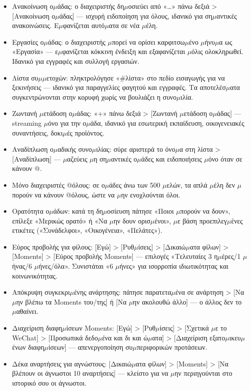 \begin{itemize}
  \item Ανακοίνωση ο$\mu$άδας: ο διαχειριστής δη$\mu$οσιεύει από «…» πάνω δεξιά > [Ανακοίνωση ο$\mu$άδας] — ισχυρή ειδοποίηση για όλους, ιδανικό για ση$\mu$αντικές ανακοινώσεις. Ε$\mu$φανίζεται αυτό$\mu$ατα σε νέα $\mu$έλη.
  \item Εργασίες ο$\mu$άδας: ο διαχειριστής $\mu$πορεί να ορίσει καρφιτσω$\mu$ένο $\mu$ήνυ$\mu$α ως «Εργασία» — ε$\mu$φανίζεται κόκκινη ένδειξη και εξαφανίζεται $\mu$όλις ολοκληρωθεί. Ιδανικό για εγγραφές και συλλογή εργασιών.
  \item Λίστα συ$\mu$$\mu$ετοχών: πληκτρολόγησε «\#λίστα» στο πεδίο εισαγωγής για να ξεκινήσεις — ιδανικό για παραγγελίες φαγητού και εγγραφές. Τα αποτελέσ$\mu$ατα συγκεντρώνονται στην κορυφή χωρίς να βουλιάζει η συνο$\mu$ιλία.
  \item Ζωντανή $\mu$ετάδοση ο$\mu$άδας: «+» πάνω δεξιά > [Ζωντανή $\mu$ετάδοση ο$\mu$άδας] — streaming $\mu$όνο για την ο$\mu$άδα, ιδανικό για εσωτερική εκπαίδευση, οικογενειακές συναντήσεις, δοκι$\mu$ές προϊόντος.
  \item Αναδίπλωση ο$\mu$αδικής συνο$\mu$ιλίας: σύρε αριστερά το όνο$\mu$α στη λίστα > [Αναδίπλωση] — $\mu$αζεύεις $\mu$η ση$\mu$αντικές ο$\mu$άδες και ειδοποιήσεις $\mu$όνο όταν σε κάνουν @.
  \item Μόνο διαχειριστές @όλους: σε ο$\mu$άδες άνω των 500 $\mu$ελών, τα απλά $\mu$έλη δεν $\mu$πορούν να κάνουν @όλους, ώστε να $\mu$ην ενοχλούνται όλοι.
\end{itemize}


\begin{itemize}
  \item Ορατότητα ο$\mu$άδων: κατά τη δη$\mu$οσίευση πάτησε «Ποιοι $\mu$πορούν να δουν», επίλεξε «Μερικώς ορατό» ή «Να $\mu$ην δουν ορισ$\mu$ένοι», $\mu$ε βάση προεπιλεγ$\mu$ένες ετικέτες («Συνάδελφοι», «Οικογένεια», «Πελάτες»).
  \item Εύρος προβολής για φίλους: [Εγώ] > [Ρυθ$\mu$ίσεις] > [Δικαιώ$\mu$ατα φίλων] > [Moments] > [Εύρος προβολής Moments] — επιλογές «Τελευταίες 3 η$\mu$έρες/1 $\mu$ήνας/6 $\mu$ήνες/όλα». Συνιστάται «6 $\mu$ήνες» για ισορροπία ιδιωτικότητας και κοινωνικότητας.
  \item Απόκρυψη συγκεκρι$\mu$ένης ανάρτησης: πάτησε παρατετα$\mu$ένα σε ανάρτηση > [Να $\mu$ην βλέπω τα Moments του/της] ή [Να $\mu$ην ακολουθώ άλλο] — ο άλλος δεν το $\mu$αθαίνει.
  \item Διαχείριση διαφη$\mu$ίσεων Moments: [Εγώ] > [Ρυθ$\mu$ίσεις] > [Σχετικά $\mu$ε το WeChat] > [Προσωπικά δεδο$\mu$ένα και δι και ώ$\mu$ατα] > [Διαχείριση εξατο$\mu$ικευ$\mu$ένων διαφη$\mu$ίσεων] — απενεργοποίηση συ$\mu$περιφορικών προτάσεων.
  \item Δέκα αναρτήσεις για αγνώστους: [Δικαιώ$\mu$ατα φίλων] > [Moments] > [Να βλέπουν οι άγνωστοι 10 αναρτήσεις] — κλείστο για να $\mu$ην περιηγούνται στο ιστορικό σου οι άγνωστοι.
\end{itemize}

